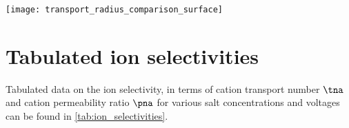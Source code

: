 %
\begin{figure*}[t]
  \centering
  \texttt{[image: transport\_radius\_comparison\_surface]}

  \caption[\textit{Lumen} diameters of {ClyA}.]%
  {%
    \textbf{\textit{Lumen} diameters of {ClyA}.}
    Side and top view of the molecular surface of the \gls{clya-as} equilibrated with \gls{md} (left), with
    the crystal ~\cite{Mueller-2009} (middle) and \gls{cryo-em} ~\cite{Peng-2019}
    (right) structures. Surfaces were colored according to $r_{\text{int}}$, the distance of each atom from
    the central axis of the pore, reduced with its van der Waals radius (see~\cref{eq:internal_radius}). The
    traditional diameter of \SI{5.5}{\nm} and the \SI{6.0}{\nm} are outlined in orange and pink respectively.
    Images were rendered using \gls{vmd}~\cite{Humphrey-1996}.
  }\label{fig:transport_radius_comparison_surface}
\end{figure*}



%
\section{Tabulated ion selectivities}
%
\label{sec:transport_appendix:tab_ion_sel}
%

Tabulated data on the ion selectivity, in terms of cation transport number $\tna$ and cation permeability
ratio $\pna$ for various salt concentrations and voltages can be found in \cref{tab:ion_selectivities}.

